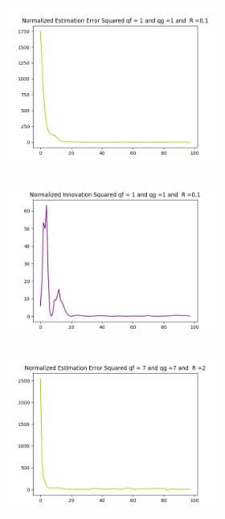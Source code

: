 \documentclass{article}
\begin{document}
        \begin{figure}[H]
            \centering 
            \begin{subfigure}{1\textwidth}  
                \begin{subfigure}{.5\textwidth}
                    \centering   
                    \includegraphics[width=.6\linewidth]{./img/acc/nees1_qg1_r01.png}
                    \caption{ }
                \end{subfigure}
                \begin{subfigure}{.5\textwidth}  
                    \centering 
                    \includegraphics[width=.6\linewidth]{./img/acc/nis1_qg1_r01.png}
                    \caption{}
                \end{subfigure}
                \begin{subfigure}{.5\textwidth} 
                    \centering  
                    \includegraphics[width=.6\linewidth]{./img/acc/nees7_qg7_r2.png}

\end{subfigure}
\end{subfigure}
\end{figure}
\end{document}

